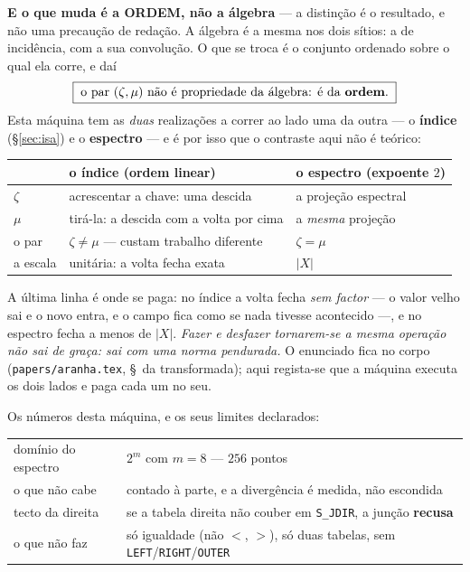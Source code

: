 \documentclass[11pt,a4paper]{article}
\newcommand{\code}[1]{\texttt{\small #1}}
\begin{document}
\smallskip
\noindent\textbf{E o que muda é a ORDEM, não a álgebra} --- a distinção é o resultado, e não uma
precaução de redação. A álgebra é a mesma nos dois sítios: a de incidência, com a sua convolução.
O que se troca é o conjunto ordenado sobre o qual ela corre, e daí
\[
\boxed{\;\text{o par }(\zeta,\mu)\text{ não é propriedade da álgebra: é da \textbf{ordem}.}\;}
\]
Esta máquina tem as \emph{duas} realizações a correr ao lado uma da outra --- o \textbf{índice}
(\S\ref{sec:isa}) e o \textbf{espectro} --- e é por isso que o contraste aqui não é teórico:

\begin{center}\small
\begin{tabular}{@{}lll@{}}
\toprule
 & \textbf{o índice} (ordem linear) & \textbf{o espectro} (expoente $2$)\\
\midrule
$\zeta$ & acrescentar a chave: uma descida & a projeção espectral\\
$\mu$ & tirá-la: a descida com a volta por cima & a \emph{mesma} projeção\\
o par & $\zeta\neq\mu$ --- custam trabalho diferente & $\zeta=\mu$\\
a escala & unitária: a volta fecha exata & $\lvert X\rvert$\\
\bottomrule
\end{tabular}
\end{center}

\noindent A última linha é onde se paga: no índice a volta fecha \emph{sem factor} --- o valor
velho sai e o novo entra, e o campo fica como se nada tivesse acontecido ---, e no espectro fecha
a menos de $\lvert X\rvert$. \emph{Fazer e desfazer tornarem-se a mesma operação não sai de graça:
sai com uma norma pendurada.} O enunciado fica no corpo (\code{papers/aranha.tex}, §~da
transformada); aqui regista-se que a máquina executa os dois lados e paga cada um no seu.

\smallskip
\noindent Os números desta máquina, e os seus limites declarados:

\begin{center}\small
\begin{tabular}{@{}ll@{}}
\toprule
domínio do espectro & $2^{m}$ com $m=8$ --- $256$ pontos \\
o que não cabe & contado à parte, e a divergência é medida, não escondida \\
tecto da direita & se a tabela direita não couber em \code{S\_JDIR}, a junção \textbf{recusa} \\
o que não faz & só igualdade (não $<$, $>$), só duas tabelas, sem \code{LEFT}/\code{RIGHT}/\code{OUTER} \\
\bottomrule
\end{tabular}
\end{center}
\end{document}

